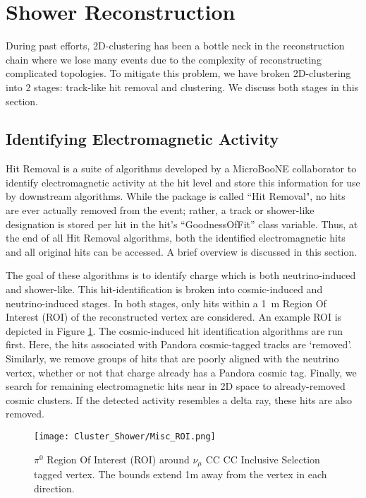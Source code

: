 \clearpage
\section{Shower Reconstruction}
During past efforts, 2D-clustering has been a bottle neck in the reconstruction chain where we lose many events due to the complexity of reconstructing complicated topologies. To mitigate this problem, we have broken 2D-clustering into 2 stages: track-like hit removal and clustering. We discuss both stages in this section.

\subsection{Identifying Electromagnetic Activity}
Hit Removal is a suite of algorithms developed by a MicroBooNE collaborator to identify electromagnetic activity at the hit level and store this information for use by downstream algorithms. While the package is called ``Hit Removal", no hits are ever actually removed from the event; rather, a track or shower-like designation is stored per hit in the hit's ``GoodnessOfFit'' class variable. Thus, at the end of all Hit Removal algorithms, both the identified electromagnetic hits and all original hits can be accessed. A brief overview is discussed in this section. %

\par The goal of these algorithms is to identify charge which is both neutrino-induced and shower-like. This hit-identification is broken into cosmic-induced and neutrino-induced stages.  In both stages, only hits within a 1~m Region Of Interest (ROI) of the reconstructed vertex are considered. An example ROI is depicted in Figure \ref{fig:roi}. The cosmic-induced hit identification algorithms are run first.  Here, the hits associated with Pandora cosmic-tagged tracks are `removed'.  Similarly, we remove groups of hits that are poorly aligned with the neutrino vertex, whether or not that charge already has a Pandora cosmic tag. Finally, we search for remaining electromagnetic hits near in 2D space to already-removed cosmic clusters. If the detected activity resembles a delta ray, these hits are also removed. 

\begin{figure}[h!]
\centering
\texttt{[image: Cluster\_Shower/Misc\_ROI.png]}
\caption{$\pi^0$ Region Of Interest (ROI) around $\nu_\mu$ CC CC Inclusive Selection tagged  vertex. The bounds extend 1m away from the vertex in each direction. }
\label{fig:roi}
\end{figure}

